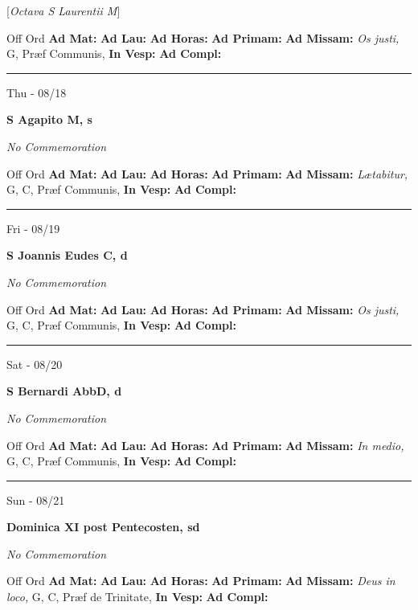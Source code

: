 \documentclass[letterpaper, 10pt]{article}
\begin{document}
[\textit{Octava S Laurentii M}]
\begin{justify}
Off Ord
\textbf{Ad Mat: }
\textbf{Ad Lau: }
\textbf{Ad Horas: }
\textbf{Ad Primam: }
\textbf{Ad Missam:} \textit{Os justi, } G, Præf Communis, 
\textbf{In Vesp: }
\textbf{Ad Compl: }\end{justify}



\hrule
\begin{center}
Thu - 08/18
\end{center}\textbf{ \large S Agapito M, \textnormal{\normalsize s}}

\textit{No Commemoration}\begin{justify}
Off Ord
\textbf{Ad Mat: }
\textbf{Ad Lau: }
\textbf{Ad Horas: }
\textbf{Ad Primam: }
\textbf{Ad Missam:} \textit{Lætabitur, } G, C, Præf Communis, 
\textbf{In Vesp: }
\textbf{Ad Compl: }\end{justify}



\hrule
\begin{center}
Fri - 08/19
\end{center}\textbf{ \large S Joannis Eudes C, \textnormal{\normalsize d}}

\textit{No Commemoration}\begin{justify}
Off Ord
\textbf{Ad Mat: }
\textbf{Ad Lau: }
\textbf{Ad Horas: }
\textbf{Ad Primam: }
\textbf{Ad Missam:} \textit{Os justi, } G, C, Præf Communis, 
\textbf{In Vesp: }
\textbf{Ad Compl: }\end{justify}



\hrule
\begin{center}
Sat - 08/20
\end{center}\textbf{ \large S Bernardi AbbD, \textnormal{\normalsize d}}

\textit{No Commemoration}\begin{justify}
Off Ord
\textbf{Ad Mat: }
\textbf{Ad Lau: }
\textbf{Ad Horas: }
\textbf{Ad Primam: }
\textbf{Ad Missam:} \textit{In medio, } G, C, Præf Communis, 
\textbf{In Vesp: }
\textbf{Ad Compl: }\end{justify}



\hrule
\begin{center}
Sun - 08/21
\end{center}\textbf{ \large Dominica XI post Pentecosten, \textnormal{\normalsize sd}}

\textit{No Commemoration}\begin{justify}
Off Ord
\textbf{Ad Mat: }
\textbf{Ad Lau: }
\textbf{Ad Horas: }
\textbf{Ad Primam: }
\textbf{Ad Missam:} \textit{Deus in loco, } G, C, Præf de Trinitate, 
\textbf{In Vesp: }
\textbf{Ad Compl: }\end{justify}
\end{document}
